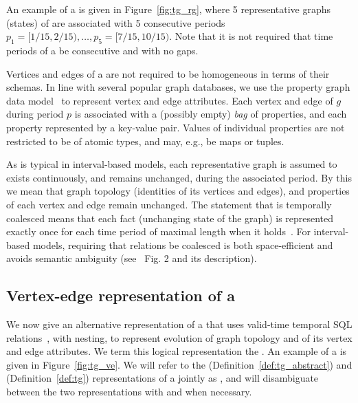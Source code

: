 An example of a \tg is given in Figure~\ref{fig:tg_rg}, where 5
representative graphs (states) of  are associated with 5
consecutive periods $p_1=[1/15, 2/15), \ldots, p_5=[7/15, 10/15)$.
    Note that it is not required that time periods of a \tg be
    consecutive and with no gaps.

    Vertices and edges of a \tg are not required to be homogeneous in
    terms of their schemas.  In line with several popular graph
    databases, we use the property graph data model~\cite{GraphDB} to
    represent vertex and edge attributes.  Each vertex and edge of $g$
    during period $p$ is associated with a (possibly empty) {\em bag}
    of properties, and each property represented by a key-value pair.
    Values of individual properties are not restricted to be of atomic
    types, and may, e.g., be maps or tuples.

As is typical in interval-based models, each representative graph is
assumed to exists continuously, and remains unchanged, during the
associated period.  By this we mean that graph topology (identities of
its vertices and edges), and properties of each vertex and edge remain
unchanged.
%
The statement that \tgg is temporally coalesced means that each fact
(unchanging state of the graph) is represented exactly once for each
time period of maximal length when it
holds~\cite{DBLP:conf/vldb/BohlenSS96}.  For interval-based models,
requiring that relations be coalesced is both space-efficient and
avoids semantic ambiguity (see~\cite{DBLP:reference/db/JensenS09k}
Fig. 2 and its description).

\subsection{Vertex-edge representation of a \tg}
\label{sec:model:ve}

We now give an alternative representation of a \tg that uses
valid-time temporal SQL relations~\cite{DBLP:conf/vldb/BohlenSS96},
with nesting, to represent evolution of graph topology and of its
vertex and edge attributes.  We term this logical representation the
{\em \ve \tg}.  An example of a \ve \tg is given in
Figure~\ref{fig:tg_ve}.  We will refer to the \rgs
(Definition~\ref{def:tg_abstract}) and \ve (Definition~\ref{def:tg})
representations of a \tg jointly as , and will disambiguate
between the two representations with \trg and \tve when necessary.

